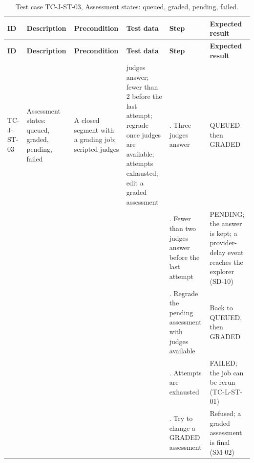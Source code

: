 {\footnotesize{}\renewcommand{\arraystretch}{1.1}
\begin{longtable}{|>{\raggedright\arraybackslash}p{}|>{\raggedright\arraybackslash}p{}|>{\raggedright\arraybackslash}p{}|>{\raggedright\arraybackslash}p{}|>{\raggedright\arraybackslash}p{}|>{\raggedright\arraybackslash}p{}|}
\caption{Test case TC-J-ST-03, Assessment states: queued, graded, pending, failed.} \\
\hline
\textbf{ID} & \textbf{Description} & \textbf{Precondition} & \textbf{Test data} & \textbf{Step} & \textbf{Expected result} \\ \hline
\endfirsthead
\hline
\textbf{ID} & \textbf{Description} & \textbf{Precondition} & \textbf{Test data} & \textbf{Step} & \textbf{Expected result} \\ \hline
\endhead
TC-J-ST-03 & Assessment states: queued, graded, pending, failed & A closed segment with a grading job; scripted judges & 3 judges answer; fewer than 2 before the last attempt; regrade once judges are available; attempts exhausted; edit a graded assessment & 1. Three judges answer & QUEUED then GRADED \\ \cline{5-6}
 &  &  &  & 2. Fewer than two judges answer before the last attempt & PENDING; the answer is kept; a provider-\allowbreak{}delay event reaches the explorer (SD-10) \\ \cline{5-6}
 &  &  &  & 3. Regrade the pending assessment with judges available & Back to QUEUED, then GRADED \\ \cline{5-6}
 &  &  &  & 4. Attempts are exhausted & FAILED; the job can be rerun (TC-\allowbreak{}L-\allowbreak{}ST-\allowbreak{}01) \\ \cline{5-6}
 &  &  &  & 5. Try to change a GRADED assessment & Refused; a graded assessment is final (SM-02) \\ \hline
\end{longtable}
}

